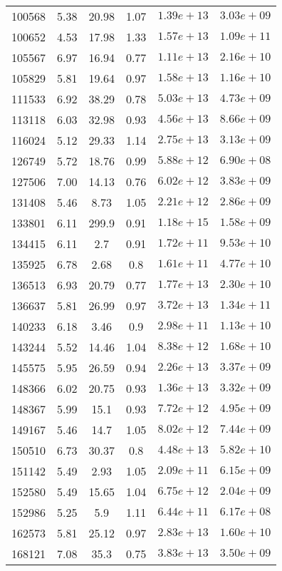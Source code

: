 \begin{table}
\begin{tabular}{cccccc}
100568 & 5.38 & 20.98 & 1.07 & $1.39e+13$ & $3.03e+09$ \\
100652 & 4.53 & 17.98 & 1.33 & $1.57e+13$ & $1.09e+11$ \\
105567 & 6.97 & 16.94 & 0.77 & $1.11e+13$ & $2.16e+10$ \\
105829 & 5.81 & 19.64 & 0.97 & $1.58e+13$ & $1.16e+10$ \\
111533 & 6.92 & 38.29 & 0.78 & $5.03e+13$ & $4.73e+09$ \\
113118 & 6.03 & 32.98 & 0.93 & $4.56e+13$ & $8.66e+09$ \\
116024 & 5.12 & 29.33 & 1.14 & $2.75e+13$ & $3.13e+09$ \\
126749 & 5.72 & 18.76 & 0.99 & $5.88e+12$ & $6.90e+08$ \\
127506 & 7.00 & 14.13 & 0.76 & $6.02e+12$ & $3.83e+09$ \\
131408 & 5.46 & 8.73 & 1.05 & $2.21e+12$ & $2.86e+09$ \\
133801 & 6.11 & 299.9 & 0.91 & $1.18e+15$ & $1.58e+09$ \\
134415 & 6.11 & 2.7 & 0.91 & $1.72e+11$ & $9.53e+10$ \\
135925 & 6.78 & 2.68 & 0.8 & $1.61e+11$ & $4.77e+10$ \\
136513 & 6.93 & 20.79 & 0.77 & $1.77e+13$ & $2.30e+10$ \\
136637 & 5.81 & 26.99 & 0.97 & $3.72e+13$ & $1.34e+11$ \\
140233 & 6.18 & 3.46 & 0.9 & $2.98e+11$ & $1.13e+10$ \\
143244 & 5.52 & 14.46 & 1.04 & $8.38e+12$ & $1.68e+10$ \\
145575 & 5.95 & 26.59 & 0.94 & $2.26e+13$ & $3.37e+09$ \\
148366 & 6.02 & 20.75 & 0.93 & $1.36e+13$ & $3.32e+09$ \\
148367 & 5.99 & 15.1 & 0.93 & $7.72e+12$ & $4.95e+09$ \\
149167 & 5.46 & 14.7 & 1.05 & $8.02e+12$ & $7.44e+09$ \\
150510 & 6.73 & 30.37 & 0.8 & $4.48e+13$ & $5.82e+10$ \\
151142 & 5.49 & 2.93 & 1.05 & $2.09e+11$ & $6.15e+09$ \\
152580 & 5.49 & 15.65 & 1.04 & $6.75e+12$ & $2.04e+09$ \\
152986 & 5.25 & 5.9 & 1.11 & $6.44e+11$ & $6.17e+08$ \\
162573 & 5.81 & 25.12 & 0.97 & $2.83e+13$ & $1.60e+10$ \\
168121 & 7.08 & 35.3 & 0.75 & $3.83e+13$ & $3.50e+09$ \\

\end{tabular}
\end{table}
